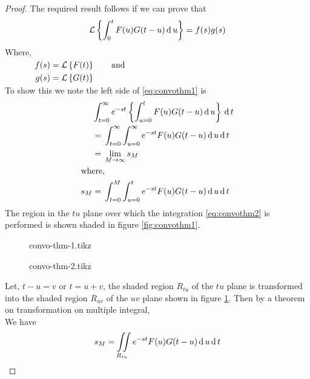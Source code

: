 \documentclass[../main-sheet.tex]{subfiles}
\begin{document}
\begin{proof}
    The required result follows if we can prove that
    \begin{equation}
        \mathcal{L}\left\{ \int_0^t F(u) G(t-u)\,\mathrm{d}\, u\right\}=f(s)g(s)\label{eq:convothm1}
    \end{equation}
    Where, $ \begin{aligned}[t]
                 &                             \\
            f(s) & =\mathcal{L}\left\{ F(t)\right\}\qquad\text{and} \\
            g(s) & =\mathcal{L}\left\{ G(t)\right\}
        \end{aligned} $\\
    To show this we note the left side of \eqref{eq:convothm1} is
    \begin{align}
            & \int_{t=0}^\infty e^{-st}\left\{ \int_{u=0}^t F(u)G(t-u)\,\mathrm{d}\, u \right\}\,\mathrm{d}\, t\notag \\
            & =\, \int_{t=0}^\infty \int_{u=0}^\infty e^{-st} F(u)G(t-u)\,\mathrm{d}\, u \,\mathrm{d}\, t\notag       \\
            & =\, \lim_{M\to \infty} s_M\notag                                                \\
        \intertext{where,}
        s_M & =\, \int_{t=0}^M \int_{u=0}^t e^{-st} F(u)G(t-u)\,\mathrm{d}\, u \,\mathrm{d}\, t\label{eq:convothm2}
    \end{align}
    The region in the $ tu $ plane over which the integration \eqref{eq:convothm2} is performed is shown shaded in figure \ref{fig:convothm1}.
    \begin{figure}[H]
        \begin{minipage}[b]{0.5\textwidth}
            \centering
            {convo-thm-1.tikz}
            \caption{}
            \label{fig:convothm1}
        \end{minipage}
        \begin{minipage}[b]{0.5\textwidth}
            \centering
            {convo-thm-2.tikz}
            \caption{}
            \label{fig:convothm2}
        \end{minipage}
    \end{figure}
    Let, $ t-u=v $ or $ t=u+v $, the shaded region $ R_{tu} $ of the $ tu $ plane is transformed into the shaded region $ R_{uv} $ of the $ uv  $ plane shown in figure \ref{fig:convothm2}. Then by a theorem on transformation on multiple integral,\\ We have
    \begin{align}
        s_M & =\iint\limits_{R_{tu}} e^{-st}F(u)G(t-u)\D u\D t\notag                                                            \\

\end{align}
\end{proof}
\end{document}
